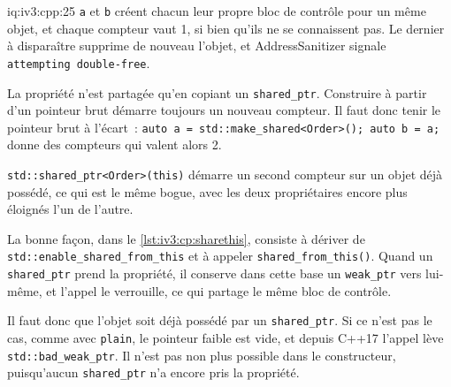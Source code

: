 \begin{solution}{iq:iv3:cpp:25}
\texttt{a} et \texttt{b} créent chacun leur propre bloc de contrôle pour un même objet, et chaque compteur vaut 1, si bien qu'ils ne se connaissent pas. Le dernier à disparaître supprime de nouveau l'objet, et AddressSanitizer signale \texttt{attempting double-free}.

La propriété n'est partagée qu'en copiant un \texttt{shared\_ptr}. Construire à partir d'un pointeur brut démarre toujours un nouveau compteur. Il faut donc tenir le pointeur brut à l'écart~: \texttt{auto a = std::make\_shared<Order>(); auto b = a;} donne des compteurs qui valent alors 2.

\texttt{std::shared\_ptr<Order>(this)} démarre un second compteur sur un objet déjà possédé, ce qui est le même bogue, avec les deux propriétaires encore plus éloignés l'un de l'autre.

La bonne façon, dans le \cref{lst:iv3:cp:sharethis}, consiste à dériver de \texttt{std::enable\_shared\_from\_this} et à appeler \texttt{shared\_from\_this()}. Quand un \texttt{shared\_ptr} prend la propriété, il conserve dans cette base un \texttt{weak\_ptr} vers lui-même, et l'appel le verrouille, ce qui partage le même bloc de contrôle.
\enlargethispage{-3\baselineskip}%
\label{lst:iv3:cp:sharethis}

Il faut donc que l'objet soit déjà possédé par un \texttt{shared\_ptr}. Si ce n'est pas le cas, comme avec \texttt{plain}, le pointeur faible est vide, et depuis C++17 l'appel lève \texttt{std::bad\_weak\_ptr}. Il n'est pas non plus possible dans le constructeur, puisqu'aucun \texttt{shared\_ptr} n'a encore pris la propriété.

\end{solution}

